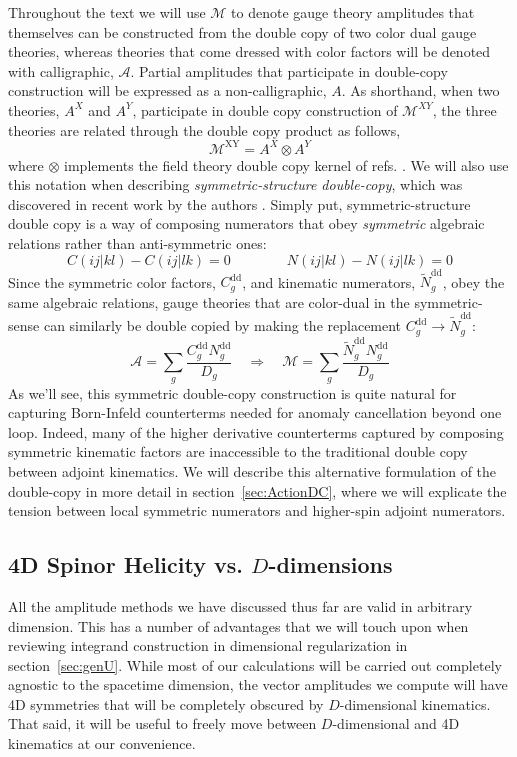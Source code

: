 \documentclass[12pt,letter]{article}
\def\sect#1{section~\ref{#1}}
\def\be{\begin{equation}}
\def\ee{\end{equation}}
\begin{document}
Throughout the text we will use $\mathcal{M}$ to denote gauge theory amplitudes that themselves can be constructed from the double copy of two color dual gauge theories, whereas theories that come dressed with color factors will be denoted with calligraphic, $\mathcal{A}$. Partial amplitudes that participate in double-copy construction will be expressed as a non-calligraphic, $A$. As shorthand, when two theories, $A^X$ and $A^Y$, participate in double copy construction of $\mathcal{M}^{XY}$, the three theories are related through the double copy product as follows,
\be
\mathcal{M}^{\text{XY}} = A^X \otimes A^Y
\ee
where $\otimes$ implements the field theory double copy kernel of refs. \cite{KLT, BCJ}. We will also use this notation when describing \textit{symmetric-structure double-copy}, which was discovered in recent work by the authors \cite{Carrasco:2022jxn}. Simply put, symmetric-structure double copy is a way of composing numerators that obey \textit{symmetric} algebraic relations rather than anti-symmetric ones:
\be
C{(ij|kl)}-C{(ij|lk)} =0  \qquad \qquad N{(ij|kl)}-N{(ij|lk)} =0 
\ee
Since the symmetric color factors, $C^{\text{dd}}_g$, and kinematic numerators, $\tilde{N}^{\text{dd}}_g$, obey the same algebraic relations, gauge theories that are color-dual in the symmetric-sense can similarly be double copied by making the replacement $C^{\text{dd}}_g\rightarrow \tilde{N}^{\text{dd}}_g$:
\be
\mathcal{A} = \sum_{g}\frac{C^{\text{dd}}_gN^{\text{dd}}_g}{D_g} \quad \Rightarrow \quad \mathcal{M} = \sum_{g}\frac{\tilde{N}^{\text{dd}}_gN^{\text{dd}}_g}{D_g}
\ee
As we'll see, this symmetric double-copy construction is quite natural for capturing Born-Infeld counterterms needed for anomaly cancellation beyond one loop. Indeed, many of the higher derivative counterterms captured by composing symmetric kinematic factors are inaccessible to the traditional double copy between adjoint kinematics. We will describe this alternative formulation of the double-copy in more detail in \sect{sec:ActionDC}, where we will explicate the tension between local symmetric numerators and higher-spin adjoint numerators. 
\subsection{4D Spinor Helicity vs. $D$-dimensions}
\label{subsec:4DandDDReview}
All the amplitude methods we have discussed thus far are valid in arbitrary dimension. This has a number of advantages that we will touch upon when reviewing integrand construction in dimensional regularization in \sect{sec:genU}. While most of our calculations will be carried out completely agnostic to the spacetime dimension, the vector amplitudes we compute will have 4D symmetries that will be completely obscured by $D$-dimensional kinematics. That said, it will be useful to freely move between $D$-dimensional and 4D kinematics at our convenience. 
\end{document}
